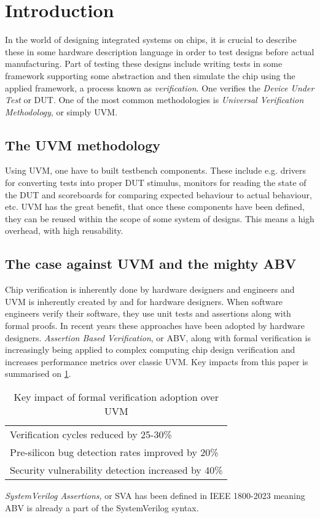 \section{Introduction}\label{sec:02}
In the world of designing integrated systems on chips, it is crucial to describe these in some hardware description language in order to test designs before actual manufacturing. Part of testing these designs include writing tests in some framework supporting some abstraction and then simulate the chip using the applied framework, a process known as \emph{verification}. One verifies the \emph{Device Under Test} or DUT. One of the most common methodologies is \emph{Universal Verification Methodology}, or simply UVM.
\subsection{The UVM methodology}
Using UVM, one have to built testbench components. These include e.g. drivers for converting tests into proper DUT stimulus, monitors for reading the state of the DUT and scoreboards for comparing expected behaviour to actual behaviour, etc. UVM has the great benefit, that once these components have been defined, they can be reused within the scope of some system of designs. This means a high overhead, with high reusability.
\subsection{The case against UVM and the mighty ABV}
Chip verification is inherently done by hardware designers and engineers and UVM is inherently created by and for hardware designers. When software engineers verify their software, they use unit tests and assertions along with formal proofs. In recent years these approaches have been adopted by hardware designers. \emph{Assertion Based Verification}, or ABV, along with formal verification is increasingly being applied to complex computing chip design verification and increases performance metrics over classic UVM\cite{reddy_formal_2024}. Key impacts from this paper is summarised on \cref{tbl:ABVOverUVM}.
\begin{table}[H]
    \centering
    \caption{Key impact of formal verification adoption over UVM\cite{reddy_formal_2024}}\label{tbl:ABVOverUVM}
    \begin{tabular}{l}
        \toprule
        Verification cycles reduced by 25-30\%             \\
        Pre-silicon bug detection rates improved by 20\%   \\
        Security vulnerability detection increased by 40\% \\
        \bottomrule
    \end{tabular}
\end{table}
\emph{SystemVerilog Assertions}, or SVA has been defined in IEEE 1800-2023\cite[Chapter 16]{noauthor_ieee_2024} meaning ABV is already a part of the SystemVerilog syntax.
